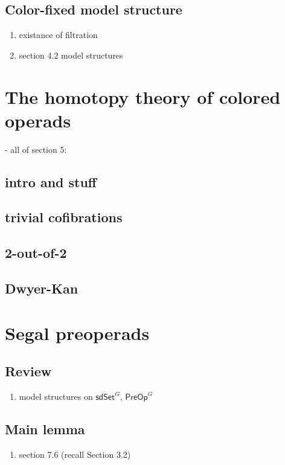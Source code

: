\documentclass[a4paper,10pt
]{article}%
\renewcommand{\1}{\ensuremath{\mathbb{id}}}
\begin{document}
\subsection{Color-fixed model structure}

\begin{enumerate}
\item existance of filtration
\item section 4.2 model structures
\end{enumerate}

\section{The homotopy theory of colored operads}

- all of section 5:
\subsection{intro and stuff}
\subsection{trivial cofibrations}
\subsection{2-out-of-2}
\subsection{Dwyer-Kan}

\section{Segal preoperads}

\subsection{Review}

\begin{enumerate}
\item model structures on $\mathsf{sdSet}^G$, $\mathsf{PreOp}^G$
\end{enumerate}

\subsection{Main lemma}

\begin{enumerate}
\item section 7.6 (recall Section 3.2)
\end{enumerate}
\end{document}
